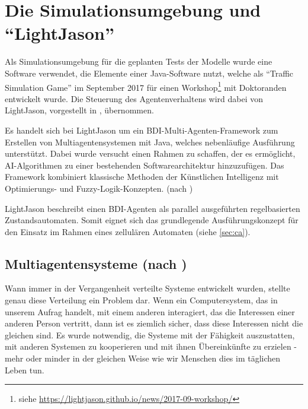 \section{Die Simulationsumgebung und \enquote{LightJason}}
\label{sec:simulationsumgebung}

Als Simulationsumgebung für die geplanten Tests der Modelle wurde eine %
Software verwendet, die Elemente einer Java-Software nutzt, welche als \enquote{Traffic Simulation Game} im September 2017 für einen Workshop\footnote{siehe \url{https://lightjason.github.io/news/2017-09-workshop/}} mit Doktoranden entwickelt wurde.
Die Steuerung des Agentenverhaltens wird dabei von LightJason, vorgestellt in \cite{lightjason}, übernommen.

Es handelt sich bei LightJason um ein BDI-Multi-Agenten-Framework zum Erstellen von Multiagentensystemen mit Java, welches nebenläufige Ausführung unterstützt. 
Dabei wurde versucht einen Rahmen zu schaffen, der es ermöglicht, AI-Algorithmen zu einer bestehenden Softwarearchitektur hinzuzufügen. 
Das Framework kombiniert klassische Methoden der Künstlichen Intelligenz mit Optimierungs- und Fuzzy-Logik-Konzepten.
(nach \cite{lightjason-web})

LightJason beschreibt einen BDI-Agenten als parallel ausgeführten regelbasierten Zustandsautomaten. Somit eignet sich das grundlegende Ausführungskonzept für den Einsatz im Rahmen eines zellulären Automaten (siehe \ref{sec:ca}).






\subsection[Multiagentensysteme]{Multiagentensysteme (nach \cite{multiagent})}
\label{sec:multiagentensysteme}

Wann immer in der Vergangenheit verteilte Systeme entwickelt wurden, stellte genau diese Verteilung ein Problem dar. 
Wenn ein Computersystem, das in unserem Aufrag handelt, mit einem anderen interagiert, das die Interessen einer anderen Person vertritt, dann ist es ziemlich sicher, dass diese Interessen nicht die gleichen sind.
Es wurde notwendig, die Systeme mit der Fähigkeit auszustatten, mit anderen Systemen zu kooperieren und mit ihnen Übereinkünfte zu erzielen - mehr oder minder in der gleichen Weise wie wir Menschen dies im täglichen Leben tun.

